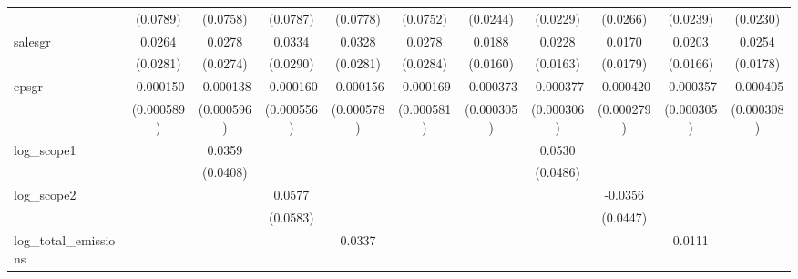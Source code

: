 \begin{table}[htbp]
\begin{tabular}{l*{10}{c}}
                    &    (0.0789)         &    (0.0758)         &    (0.0787)         &    (0.0778)         &    (0.0752)         &    (0.0244)         &    (0.0229)         &    (0.0266)         &    (0.0239)         &    (0.0230)         \\
[1em]
salesgr             &      0.0264         &      0.0278         &      0.0334         &      0.0328         &      0.0278         &      0.0188         &      0.0228         &      0.0170         &      0.0203         &      0.0254         \\
                    &    (0.0281)         &    (0.0274)         &    (0.0290)         &    (0.0281)         &    (0.0284)         &    (0.0160)         &    (0.0163)         &    (0.0179)         &    (0.0166)         &    (0.0178)         \\
[1em]
epsgr               &   -0.000150         &   -0.000138         &   -0.000160         &   -0.000156         &   -0.000169         &   -0.000373         &   -0.000377         &   -0.000420         &   -0.000357         &   -0.000405         \\
                    &  (0.000589)         &  (0.000596)         &  (0.000556)         &  (0.000578)         &  (0.000581)         &  (0.000305)         &  (0.000306)         &  (0.000279)         &  (0.000305)         &  (0.000308)         \\
[1em]
log\_scope1          &                     &      0.0359         &                     &                     &                     &                     &      0.0530         &                     &                     &                     \\
                    &                     &    (0.0408)         &                     &                     &                     &                     &    (0.0486)         &                     &                     &                     \\
[1em]
log\_scope2          &                     &                     &      0.0577         &                     &                     &                     &                     &     -0.0356         &                     &                     \\
                    &                     &                     &    (0.0583)         &                     &                     &                     &                     &    (0.0447)         &                     &                     \\
[1em]
log\_total\_emissions &                     &                     &                     &      0.0337         &                     &                     &                     &                     &      0.0111         &                     \\

\end{tabular}
\end{table}
